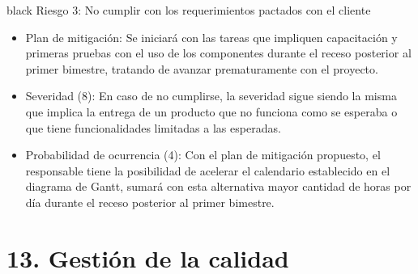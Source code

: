 \documentclass[11pt]{charter}
\begin{document}
\begin{consigna}{black}
Riesgo 3: No cumplir con los requerimientos pactados con el cliente
\begin{itemize}
\item 
Plan de mitigación: Se iniciará con las tareas que impliquen capacitación y primeras pruebas con el uso de los componentes durante el receso posterior al primer bimestre, tratando de avanzar prematuramente con el proyecto.
\item 
Severidad (8): En caso de no cumplirse, la severidad sigue siendo la misma que implica la entrega de un producto que no funciona como se esperaba o que tiene funcionalidades limitadas a las esperadas.
\item 
Probabilidad de ocurrencia (4): Con el plan de mitigación propuesto, el responsable \authorname {} tiene la posibilidad de acelerar el calendario establecido en el diagrama de Gantt, sumará con esta alternativa mayor cantidad de horas por día durante el receso posterior al primer bimestre.
\end{itemize}

\end{consigna}


\section{13. Gestión de la calidad}
\label{sec:calidad}
\end{document}
